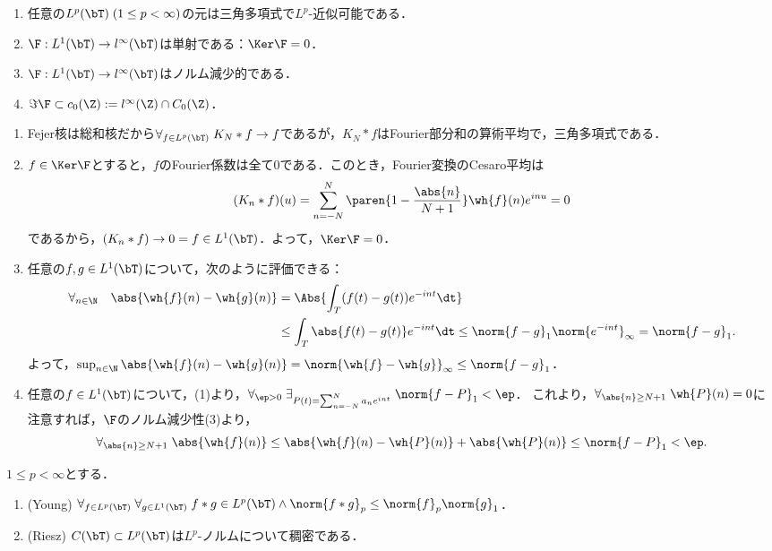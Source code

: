 \documentclass[uplatex,dvipdfmx]{jsreport}
\begin{document}
\begin{corollary}\mbox{}\label{cor-Riemann-Lebesgue}
    \begin{enumerate}
        \item 任意の$L^p(\bT)\;(1\le p<\infty)$の元は三角多項式で$L^p$-近似可能である．
        \item $\F:L^1(\bT)\to l^\infty(\bT)$は単射である：$\Ker\F=0$．
        \item $\F:L^1(\bT)\to l^\infty(\bT)$はノルム減少的である．
        \item $\Im\F\subset c_0(\Z):=l^\infty(\Z)\cap C_0(\Z)$．
    \end{enumerate}
\end{corollary}
\begin{Proof}\mbox{}
    \begin{enumerate}
        \item Fejer核は総和核だから$\forall_{f\in L^p(\bT)}\;K_N*f\to f$であるが，$K_N*f$はFourier部分和の算術平均で，三角多項式である．
        \item $f\in\Ker\F$とすると，$f$のFourier係数は全て$0$である．このとき，Fourier変換のCesaro平均は
        \[(K_n*f)(u)=\sum_{n=-N}^N\paren{1-\frac{\abs{n}}{N+1}}\wh{f}(n)e^{inu}=0\]
        であるから，$(K_n*f)\to0=f\in L^1(\bT)$．よって，$\Ker\F=0$．
        \item 任意の$f,g\in L^1(\bT)$について，次のように評価できる：
        \begin{align*}
            \forall_{n\in\N}\quad\abs{\wh{f}(n)-\wh{g}(n)}&=\Abs{\int_T(f(t)-g(t))e^{-int}\dt}\\
            &\le\int_T\abs{f(t)-g(t)}e^{-int}\dt\le\norm{f-g}_1\norm{e^{-int}}_\infty=\norm{f-g}_1.
        \end{align*}
        よって，$\sup_{n\in\N}\abs{\wh{f}(n)-\wh{g}(n)}=\norm{\wh{f}-\wh{g}}_\infty\le\norm{f-g}_1$．
        \item 任意の$f\in L^1(\bT)$について，(1)より，$\forall_{\ep>0}\;\exists_{P(t)=\sum_{n=-N}^Na_ne^{int}}\;\norm{f-P}_1<\ep$．
        これより，$\forall_{\abs{n}\ge N+1}\;\wh{P}(n)=0$に注意すれば，$\F$のノルム減少性(3)より，
        \[\forall_{\abs{n}\ge N+1}\;\abs{\wh{f}(n)}\le\abs{\wh{f}(n)-\wh{P}(n)}+\abs{\wh{P}(n)}\le\norm{f-P}_1<\ep.\]
    \end{enumerate}
\end{Proof}

\begin{lemma}
    $1\le p<\infty$とする．
    \begin{enumerate}
        \item (Young) $\forall_{f\in L^p(\bT)}\;\forall_{g\in L^1(\bT)}\;f*g\in L^p(\bT)\land \norm{f*g}_p\le\norm{f}_p\norm{g}_1$．
        \item (Riesz) $C(\bT)\subset L^p(\bT)$は$L^p$-ノルムについて稠密である．
    \end{enumerate}
\end{lemma}
\end{document}

